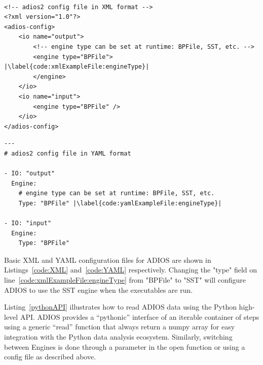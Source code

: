 \begin{minipage}{\linewidth}
\begin{lstlisting}[frame=single,label={configXML},caption={Configuration file, "config.xml" for examples shown in Listing~\ref{code:writeExampleFile} and ~\ref{code:readExampleFile}}, label=code:XML]

<!-- adios2 config file in XML format -->
<?xml version="1.0"?>
<adios-config>
    <io name="output">
        <!-- engine type can be set at runtime: BPFile, SST, etc. -->
        <engine type="BPFile"> |\label{code:xmlExampleFile:engineType}|
        </engine>
    </io>
    <io name="input">
        <engine type="BPFile" />
    </io>
</adios-config>

\end{lstlisting}
\end{minipage}

\begin{minipage}{\linewidth}
\begin{lstlisting}[frame=single,label={configYAML},caption={Alternative configuration file, "config.yaml" for examples shown in Listing~\ref{code:writeExampleFile} and ~\ref{code:readExampleFile}}, label=code:YAML]
---
# adios2 config file in YAML format

- IO: "output"
  Engine:
    # engine type can be set at runtime: BPFile, SST, etc.
    Type: "BPFile" |\label{code:yamlExampleFile:engineType}|

- IO: "input"
  Engine:
    Type: "BPFile"

\end{lstlisting}
\end{minipage}

Basic XML and YAML configuration files for ADIOS are shown in Listings~\ref{code:XML} and~\ref{code:YAML} respectively. Changing the "type" field on line~\ref{code:xmlExampleFile:engineType} from "BPFile" to "SST" will configure ADIOS to use the SST engine when the executables are run.


Listing~\ref{pythonAPI} illustrates how to read ADIOS data using the Python high-level API.
ADIOS provides a ``pythonic'' interface of an iterable container of steps using a generic ``read'' function that always return a numpy array for easy integration with the Python data analysis ecosystem. Similarly, switching between Engines is done through a parameter in the open function or using a config file as described above.

